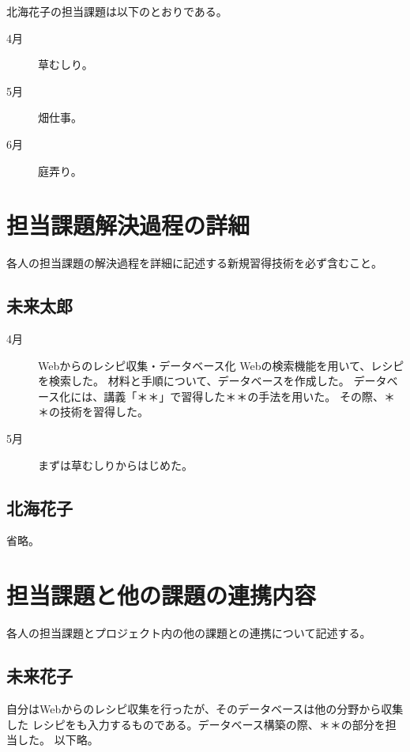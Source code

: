 \documentclass[openany,11pt,papersize]{jsbook}
\begin{document}
北海花子の担当課題は以下のとおりである。
\begin{description}
 \item[4月] 草むしり。
 \item[5月] 畑仕事。
 \item[6月] 庭弄り。
\end{description}


\section{担当課題解決過程の詳細}
\begin{hissu}
各人の担当課題の解決過程を詳細に記述する新規習得技術を必ず含むこと。
\end{hissu}

\subsection{未来太郎}
\begin{description}
 \item[4月] Webからのレシピ収集・データベース化
Webの検索機能を用いて、レシピを検索した。
材料と手順について、データベースを作成した。
データベース化には、講義「＊＊」で習得した＊＊の手法を用いた。
その際、＊＊の技術を習得した。　　
 \item[5月]まずは草むしりからはじめた。
\end{description}



\subsection{北海花子}

省略。


\section{担当課題と他の課題の連携内容}
\begin{hissu}
各人の担当課題とプロジェクト内の他の課題との連携について記述する。
\end{hissu}

\subsection{未来花子}
自分はWebからのレシピ収集を行ったが、そのデータベースは他の分野から収集した
レシピをも入力するものである。データベース構築の際、＊＊の部分を担当した。
以下略。
\end{document}
